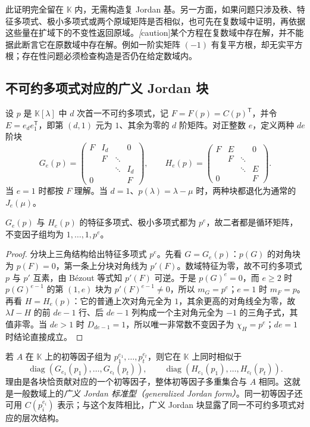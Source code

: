 此证明完全留在 $\mathbb K$ 内，无需构造复 Jordan 基。另一方面，如果问题只涉及秩、特征多项式、极小多项式或两个原域矩阵是否相似，也可先在复数域中证明，再依据这些量在扩域下的不变性返回原域。\emph[caution]{某个方程在复数域中存在解，并不能据此断言它在原数域中存在解。}例如一阶实矩阵 $(-1)$ 有复平方根，却无实平方根；存在性问题必须检查构造是否仍在给定数域内。

\subsection{不可约多项式对应的广义 Jordan 块}

设 $p$ 是 $\mathbb K[\lambda]$ 中 $d$ 次首一不可约多项式，记 $F=F(p)=C(p)^{\mathsf T}$，并令 $E=e_de_1^{\mathsf T}$，即第 $(d,1)$ 元为 $1$、其余为零的 $d$ 阶矩阵。对正整数 $e$，定义两种 $de$ 阶块
\[
 G_e(p)=\begin{pmatrix}
 F&I_d&&0\\&F&\ddots&\\&&\ddots&I_d\\0&&&F
 \end{pmatrix},
 \qquad
 H_e(p)=\begin{pmatrix}
 F&E&&0\\&F&\ddots&\\&&\ddots&E\\0&&&F
 \end{pmatrix}.
\]
当 $e=1$ 时都按 $F$ 理解。当 $d=1$、$p(\lambda)=\lambda-\mu$ 时，两种块都退化为通常的 $J_e(\mu)$。

\begin{proposition}
\label{prop:xie-ex-sim-generalized-block}
$G_e(p)$ 与 $H_e(p)$ 的特征多项式、极小多项式都为 $p^e$，故二者都是循环矩阵，不变因子组均为 $1,\ldots,1,p^e$。
\end{proposition}
\begin{proof}
分块上三角结构给出特征多项式 $p^e$。先看 $G=G_e(p)$：$p(G)$ 的对角块为 $p(F)=0$，第一条上分块对角线为 $p'(F)$。数域特征为零，故不可约多项式 $p$ 与 $p'$ 互素，由 Bézout 等式知 $p'(F)$ 可逆。于是 $p(G)^e=0$，而 $e\geq2$ 时 $p(G)^{e-1}$ 的第 $(1,e)$ 块为 $p'(F)^{e-1}\ne0$，所以 $m_G=p^e$；$e=1$ 时 $m_F=p$。再看 $H=H_e(p)$：它的普通上次对角元全为 $1$，其余更高的对角线全为零，故 $\lambda I-H$ 的前 $de-1$ 行、后 $de-1$ 列构成一个主对角元全为 $-1$ 的三角子式，其值非零。当 $de>1$ 时 $D_{de-1}=1$，所以唯一非常数不变因子为 $\chi_H=p^e$；$de=1$ 时结论直接成立。
\end{proof}

若 $A$ 在 $\mathbb K$ 上的初等因子组为 $p_1^{e_1},\ldots,p_t^{e_t}$，则它在 $\mathbb K$ 上同时相似于
\[
 \operatorname{diag}(G_{e_1}(p_1),\ldots,G_{e_t}(p_t)),
 \qquad
 \operatorname{diag}(H_{e_1}(p_1),\ldots,H_{e_t}(p_t)).
\]
理由是各块恰贡献对应的一个初等因子，整体初等因子多重集合与 $A$ 相同。这就是一般数域上的\emph{广义 Jordan 标准型（generalized Jordan form）}。同一初等因子还可用 $C(p_i^{e_i})$ 表示；与这个友阵相比，广义 Jordan 块显露了同一不可约多项式对应的层次结构。

